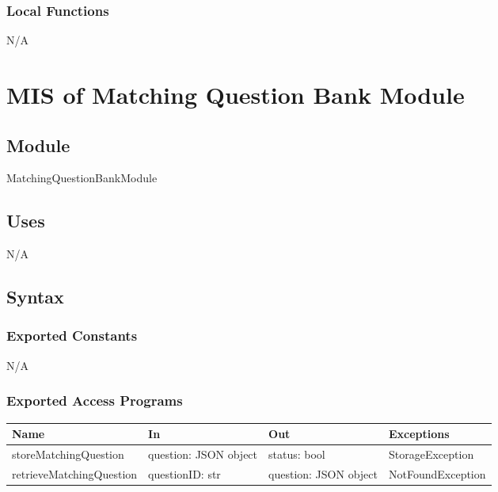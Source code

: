 \documentclass[12pt, titlepage]{article}
\begin{document}
\subsubsection{Local Functions}

N/A
\section{MIS of Matching Question Bank Module} \label{MatchingQuestionBankModule}

\subsection{Module}

MatchingQuestionBankModule

\subsection{Uses}

N/A

\subsection{Syntax}

\subsubsection{Exported Constants}

N/A

\subsubsection{Exported Access Programs}

\begin{center}
\begin{tabular}{p{5cm} p{3cm} p{3cm} p{5cm}}
\hline
\textbf{Name} & \textbf{In} & \textbf{Out} & \textbf{Exceptions} \\
\hline
storeMatchingQuestion & \raggedright\arraybackslash question: JSON object & \raggedright\arraybackslash status: bool & \raggedright\arraybackslash StorageException \\
\hline
retrieveMatchingQuestion & \raggedright\arraybackslash questionID: str & \raggedright\arraybackslash question: JSON object & \raggedright\arraybackslash NotFoundException \\
\hline
\end{tabular}
\end{center}
\end{document}

